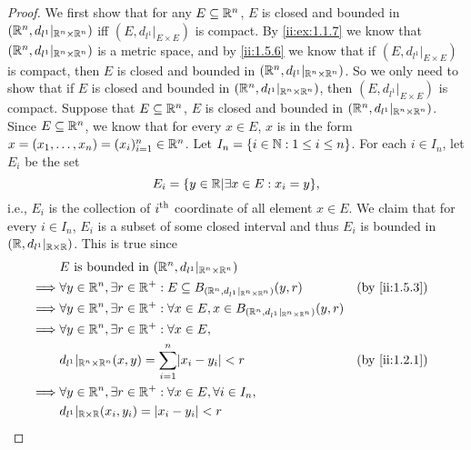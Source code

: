 \begin{proof}
  We first show that for any \(E \subseteq \mathbb{R}^n\), \(E\) is closed and bounded in \((\mathbb{R}^n, d_{l^1}|_{\mathbb{R}^n \times \mathbb{R}^n})\) iff \((E, d_{l^1}|_{E \times E})\) is compact.
  By \cref{ii:ex:1.1.7} we know that \((\mathbb{R}^n, d_{l^1}|_{\mathbb{R}^n \times \mathbb{R}^n})\) is a metric space, and by \cref{ii:1.5.6} we know that if \((E, d_{l^1}|_{E \times E})\) is compact, then \(E\) is closed and bounded in \((\mathbb{R}^n, d_{l^1}|_{\mathbb{R}^n \times \mathbb{R}^n})\).
  So we only need to show that if \(E\) is closed and bounded in \((\mathbb{R}^n, d_{l^1}|_{\mathbb{R}^n \times \mathbb{R}^n})\), then \((E, d_{l^1}|_{E \times E})\) is compact.
  Suppose that \(E \subseteq \mathbb{R}^n\), \(E\) is closed and bounded in \((\mathbb{R}^n, d_{l^1}|_{\mathbb{R}^n \times \mathbb{R}^n})\).
  Since \(E \subseteq \mathbb{R}^n\), we know that for every \(x \in E\), \(x\) is in the form \(x = (x_1, \dots, x_n) = (x_i)_{i = 1}^n \in \mathbb{R}^n\).
  Let \(I_n = \left\lbrace i \in \mathbb{N} : 1 \leq i \leq n\right\rbrace\).
  For each \(i \in I_n\), let \(E_i\) be the set
  \[
    E_i = \set{y \in \R | \exists x \in E : x_i = y},
  \]
  i.e., \(E_i\) is the collection of \(i^{\operatorname{th}}\) coordinate of all element \(x \in E\).
  We claim that for every \(i \in I_n\), \(E_i\) is a subset of some closed interval and thus \(E_i\) is bounded in \((\mathbb{R}, d_{l^1}|_{\mathbb{R} \times \mathbb{R}})\).
  This is true since
  \begin{align*}
             & E \text{ is bounded in } (\R^n, d_{l^1}|_{\R^n \times \R^n})                                                                     \\
    \implies & \forall y \in \R^n, \exists r \in \R^+ : E \subseteq B_{(\R^n, d_{l^1}|_{\R^n \times \R^n})}(y, r)            &  & \by{ii:1.5.3} \\
    \implies & \forall y \in \R^n, \exists r \in \R^+ : \forall x \in E, x \in B_{(\R^n, d_{l^1}|_{\R^n \times \R^n})}(y, r)                    \\
    \implies & \forall y \in \R^n, \exists r \in \R^+ : \forall x \in E,                                                                        \\
             & d_{l^1}|_{\R^n \times \R^n}(x, y) = \sum_{i = 1}^n \abs{x_i - y_i} < r                                        &  & \by{ii:1.2.1} \\
    \implies & \forall y \in \R^n, \exists r \in \R^+ : \forall x \in E, \forall i \in I_n,                                                     \\
             & d_{l^1}|_{\R \times \R}(x_i, y_i) = \abs{x_i - y_i} < r                                                                          \\

\end{align*}
\end{proof}
